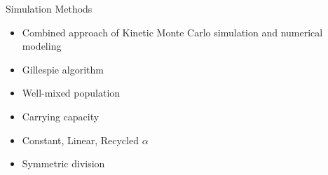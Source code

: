 \documentclass[final]{beamer}
\newlength{\sepwid}
\newlength{\onecolwid}
\begin{document}
\begin{frame}[t]
\begin{block}
\begin{columns}[t]
\begin{column}{\sepwid}\end{column} %

\begin{column}{\onecolwid}
  \begin{alertblock}{Simulation Methods}
    \begin{itemize}
      \item Combined approach of Kinetic Monte Carlo simulation and numerical modeling
      \item Gillespie algorithm
      \item Well-mixed population
      \item Carrying capacity
      \item Constant, Linear, Recycled $\alpha$
      \item Symmetric division
    \end{itemize}
  \end{alertblock}
\end{column}
\end{columns} %
\end{block}


\begin{block}

\begin{columns}[t]

\begin{column}{\onecolwid}


\end{column}
\end{columns}
\end{block}
\end{frame}
\end{document}
